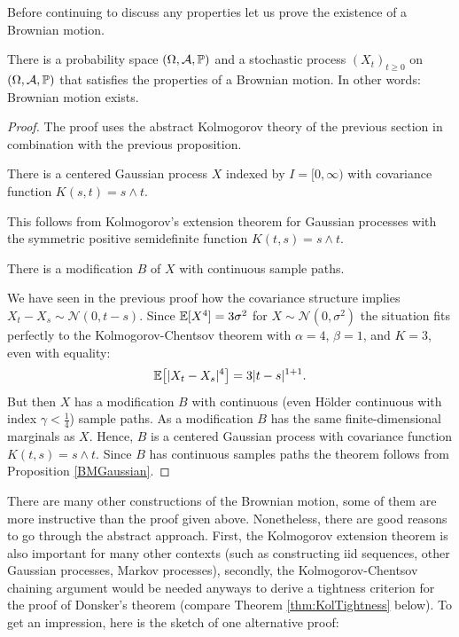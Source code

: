 Before continuing to discuss any properties let us prove the existence of a Brownian motion.  
\begin{lsuperwichtigersatzExistence}
\begin{theorem}\label{canonical_construction_BM}
	There is a probability space $(\Omega,\mathcal{A},\mathbb{P})$ and a stochastic process $(X_t)_{t\geq 0}$ on $(\Omega,\mathcal{A},\mathbb{P})$ that satisfies the properties of a Brownian motion. In other words: Brownian motion exists.
\end{theorem}
\end{lsuperwichtigersatzExistence}
\begin{proof}[Proof]
The proof uses the abstract Kolmogorov theory of the previous section in combination with the previous proposition.
\begin{lstep}
	There is a centered Gaussian process $X$ indexed by $I=[0,\infty)$ with covariance function $K(s,t)=s\wedge t$.
\end{lstep}
	This follows from Kolmogorov's extension theorem for Gaussian processes with the symmetric positive semidefinite function $K(t,s)=s\wedge t$.
\begin{lstep}
	There is a modification $B$ of $X$ with continuous sample paths.
\end{lstep}
We have seen in the previous proof how the covariance structure implies $X_t-X_s\sim \mathcal N(0,t-s)$. Since $\mathbb{E}[X^4]=3 \sigma^2$ for $X\sim \mathcal N(0,\sigma^2)$ the situation fits perfectly to the Kolmogorov-Chentsov theorem with $\alpha=4$, $\beta=1$, and $K=3$, even with equality:
	\begin{align*}
		\mathbb{E}\big[|X_t-X_s|^{4}\big]=3|t-s|^{1+1}.
	\end{align*}
But then $X$ has a modification $B$ with continuous (even H\"older continuous with index $\gamma<\frac{1}{4}$) sample paths. As a modification $B$ has the same finite-dimensional marginals as $X$. Hence, $B$ is a centered Gaussian process with covariance function $K(t,s)=s\wedge t$. Since $B$ has continuous samples paths the theorem follows from Proposition \ref{BMGaussian}.
\end{proof}
There are many other constructions of the Brownian motion, some of them are more instructive than the proof given above. Nonetheless, there are good reasons to go through the abstract approach. First, the Kolmogorov extension theorem is also important for many other contexts (such as constructing iid sequences, other Gaussian processes, Markov processes), secondly, the Kolmogorov-Chentsov chaining argument would be needed anyways to derive a tightness criterion for the proof of Donsker's theorem (compare Theorem \ref{thm:KolTightness} below). To get an impression, here is the sketch of one alternative proof:
